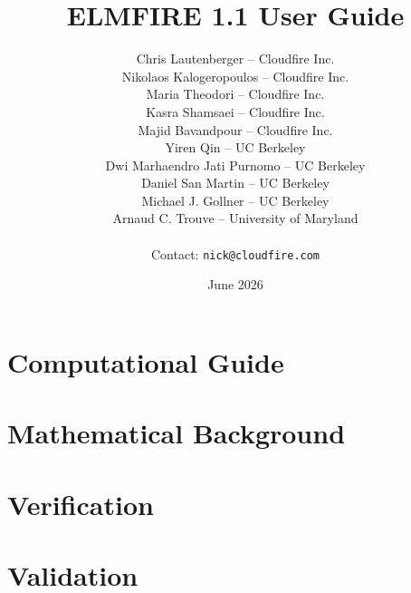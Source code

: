 \documentclass{report}
\title{ELMFIRE 1.1 User Guide}
\author{ %
Chris Lautenberger -- Cloudfire Inc. \\
Nikolaos Kalogeropoulos -- Cloudfire Inc. \\
Maria Theodori -- Cloudfire Inc. \\ 
Kasra Shamsaei -- Cloudfire Inc. \\
Majid Bavandpour -- Cloudfire Inc. \\
Yiren Qin -- UC Berkeley \\
Dwi Marhaendro Jati Purnomo -- UC Berkeley \\
Daniel San Martin -- UC Berkeley \\
Michael J. Gollner -- UC Berkeley \\
Arnaud C. Trouve -- University of Maryland \\
\\
Contact: \texttt{nick@cloudfire.com}
}
\date{June 2026}
\begin{document}
\hypersetup{pageanchor=false}
\maketitle

\tableofcontents
\clearpage
\hypersetup{pageanchor=true}

\chapter{Computational Guide}



\chapter{Mathematical Background}



\chapter{Verification}



\chapter{Validation}







\end{document}
